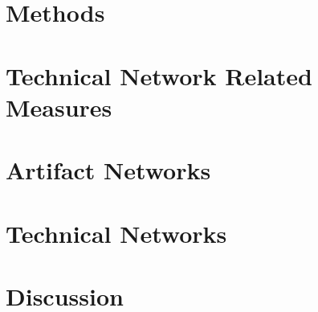 \label{chap:tech-net}

\section{Methods}
\section{Technical Network Related Measures}
\section{Artifact Networks}
\section{Technical Networks}
\section{Discussion}
